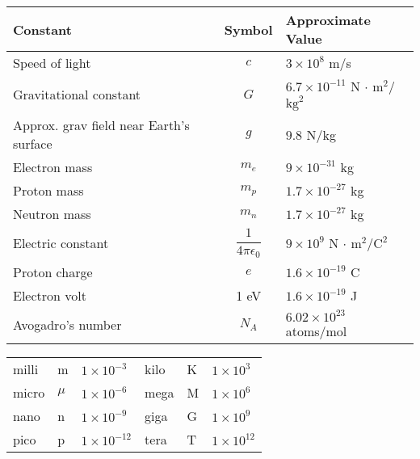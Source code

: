 \begin{tabular}{lcl}
	Constant & Symbol & Approximate Value \\ \hline
	Speed of light & $c$ & $3 \times 10^8$ m/s \\
	Gravitational constant & $G$ & $6.7 \times 10^{-11}$ N $\cdot \text{ m}^2$/$\text{kg}^2$\\
	Approx. grav field near Earth's surface & $g$ & $9.8$ N/kg\\
	Electron mass & $m_e$ & $9 \times 10^{-31}$ kg \\
	Proton mass & $m_p$ & $1.7 \times 10^{-27}$ kg \\
	Neutron mass & $m_n$ & $1.7 \times 10^{-27}$ kg \\
	Electric constant & $\dfrac{1}{4 \pi \epsilon_0}$ & $9 \times 10^9$ N $\cdot \text{ m}^2$/$\text{C}^2$\\
	Proton charge & $e$ & $1.6 \times 10^{-19}$ C \\
	Electron volt & 1 eV & $1.6 \times 10^{-19}$ J \\
	Avogadro's number & $N_A$ & $6.02 \times 10^{23}$ atoms/mol \\
	\hline
\end{tabular}

\vspace{.2in}
\begin{tabular} {lll|lll}
	milli & m & $1 \times 10^{-3}$ \hspace*{0.5in} & \hspace{0.5in} kilo & K & $1 \times 10^{3}$\\
	micro & $\mu$ & $1 \times 10^{-6}$ &  \hspace{0.5in} mega & M & $1 \times 10^{6}$\\
	nano & n &$1 \times 10^{-9}$ &  \hspace{0.5in} giga & G & $1 \times 10^{9}$\\
	pico & p & $1 \times 10^{-12}$ &  \hspace{0.5in} tera & T & $1 \times 10^{12}$ \\
\end{tabular}